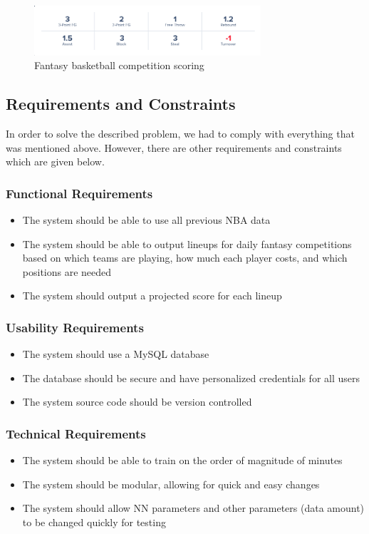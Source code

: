 \begin{figure}[ht]
    \centering
    \includegraphics[width=0.75\textwidth]{figures/fantasy_competition_scoring}
    \caption{Fantasy basketball competition scoring}
    \label{fig:comp_scoring}
\end{figure}

\subsection{Requirements and Constraints}
In order to solve the described problem, we had to comply with everything that was mentioned above. However, there are other requirements and constraints which are given below.
\subsubsection{Functional Requirements}
\begin{itemize}
\item The system should be able to use all previous NBA data
\item The system should be able to output lineups for daily fantasy competitions based on which teams are playing, how much each player costs, and which positions are needed
\item The system should output a projected score for each lineup
\end{itemize}

\subsubsection{Usability Requirements}
\begin{itemize}
\item The system should use a MySQL database
\item The database should be secure and have personalized credentials for all users
\item The system source code should be version controlled
\end{itemize}

\subsubsection{Technical Requirements}
\begin{itemize}
\item The system should be able to train on the order of magnitude of minutes
\item The system should be modular, allowing for quick and easy changes
\item The system should allow NN parameters and other parameters (data amount) to be changed quickly for testing
\end{itemize}

